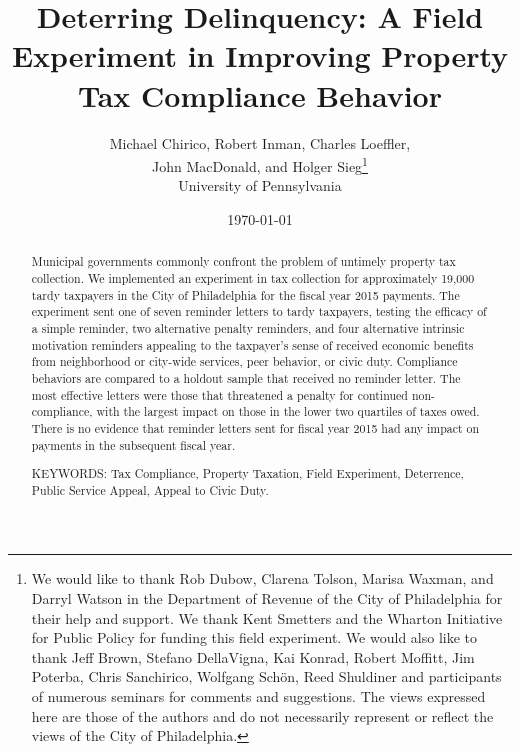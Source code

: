 \documentclass[12pt]{article}
\renewcommand{\thefootnote}{\fnsymbol{footnote}}
\begin{document}
\title{Deterring Delinquency: A Field Experiment in Improving Property Tax Compliance Behavior}

\author{Michael Chirico, Robert Inman, Charles Loeffler, \\
John MacDonald, and Holger Sieg\thanks{We would like to thank Rob
  Dubow, Clarena Tolson, Marisa Waxman, and Darryl Watson in the
  Department of Revenue of the City of Philadelphia for their help and
  support. We thank Kent Smetters and the Wharton Initiative for
  Public Policy for funding this field experiment. We would also like
  to thank Jeff Brown, Stefano DellaVigna, Kai Konrad, Robert Moffitt,
  Jim Poterba, Chris Sanchirico, Wolfgang Sch\"on, Reed Shuldiner and
  participants of numerous seminars for comments and suggestions. The
  views expressed here are those of the authors and do not necessarily
  represent or reflect the views of the City of Philadelphia.}
\\
University of Pennsylvania}

\date{\today}

\maketitle

\begin{abstract}

Municipal governments commonly confront the problem of untimely property
tax collection.  We implemented an experiment in tax collection for
approximately 19,000 tardy taxpayers in the City of Philadelphia for
the fiscal year 2015 payments.  The experiment sent one of seven
reminder letters to tardy taxpayers, testing the efficacy of a simple
reminder, two alternative penalty reminders, and four alternative
intrinsic motivation reminders appealing to the taxpayer's sense of
received economic benefits from neighborhood or city-wide services,
peer behavior, or civic duty. Compliance behaviors are compared to a
holdout sample that received no reminder letter.  The most effective letters
were those that threatened a penalty for continued non-compliance,
with the largest impact on those in the lower two quartiles of taxes
owed.  There is no evidence that reminder letters sent for fiscal year
2015 had any impact on payments in the subsequent fiscal year.

\bigskip

\noindent KEYWORDS: Tax Compliance, Property Taxation, Field
Experiment, Deterrence, Public Service Appeal, Appeal to Civic Duty.

\end{abstract}
\renewcommand{\thefootnote}{\arabic{footnote}}
\end{document}
